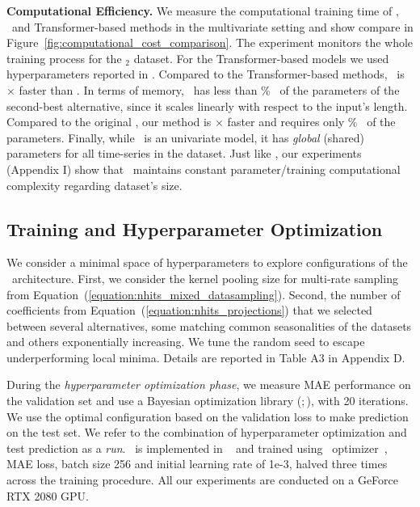 \textbf{Computational Efficiency.} We measure the computational training time of \ours, \NBEATS\ and Transformer-based methods in the multivariate setting and show compare in Figure~\ref{fig:computational_cost_comparison}. The experiment monitors the whole training process for the \ETTm$_2$ dataset. For the Transformer-based models we used hyperparameters reported in \citep{wu2021autoformer}. Compared to the Transformer-based methods, \ours\ is \inferenceGains$\times$ faster than \Autoformer. In terms of memory, \ours\ has less than \memoryGains\% \ of the parameters of the second-best alternative, since it scales linearly with respect to the input's length. Compared to the original \NBEATS, our method is \inferenceGainsNBEATS$\times$ faster and requires only \memoryGainsNBEATS\% \ of the parameters. Finally, while \ours\ is an univariate model, it has \textit{global} (shared) parameters for all time-series in the dataset. Just like \cite{oreshkin2020nbeats}, our experiments (Appendix I) show that \ours\ maintains constant parameter/training computational complexity regarding dataset's size.

\subsection{Training and Hyperparameter Optimization}
\label{section:training_methodology}

We consider a minimal space of hyperparameters to explore configurations of the \ours\ architecture.
First, we consider the kernel pooling size for multi-rate sampling from Equation~(\ref{equation:nhits_mixed_datasampling}).
Second, the number of coefficients from Equation~(\ref{equation:nhits_projections}) that we selected between several alternatives, some matching common seasonalities of the datasets and others exponentially increasing. We tune the random seed to escape underperforming local minima. Details are reported in Table A3 in Appendix D.

During the \emph{hyperparameter optimization phase}, we measure MAE performance on the validation set and use a Bayesian optimization library (\HYPEROPT;\,\citealt{bergstra2011hyperopt}), with 20 iterations. We use the optimal configuration based on the validation loss to make prediction on the test set. We refer to the combination of hyperparameter optimization and test prediction as a \emph{run}. \ours\ is implemented in \PyTorch~\citep{pytorch2019library} and trained using \ADAM\ optimizer~\citep{kingma2014adam_method}, MAE loss, batch size 256 and initial learning rate of 1e-3, halved three times across the training procedure. All our experiments are conducted on a GeForce RTX 2080 GPU.

